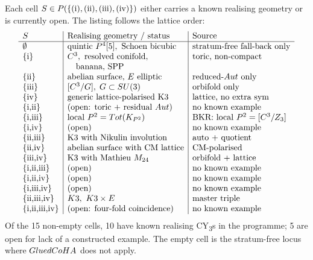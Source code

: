 \begin{example}
\label{ex:stratum-occupancy}
Each cell $S \in \mathcal{P}(\{(\text i), (\text{ii}), (\text{iii}),
(\text{iv})\})$ either carries a known realising geometry or is
currently open. The listing follows the lattice order:
\[
\begin{array}{l|l|l}
  S & \text{Realising geometry / status} &
    \text{Source} \\\hline
  \emptyset & \text{quintic } \bP^4[5],\ \text{Schoen bicubic} &
    \text{stratum-free fall-back only} \\
  \{\text{i}\} & \bC^3,\ \text{resolved conifold}, &
    \text{toric, non-compact} \\
   & \quad\text{banana, SPP} & \\
  \{\text{ii}\} & \text{abelian surface, }E\text{ elliptic} &
    \text{reduced-}\Aut\text{ only} \\
  \{\text{iii}\} & [\bC^3/G],\; G \subset SU(3) &
    \text{orbifold only} \\
  \{\text{iv}\} & \text{generic lattice-polarised K3} &
    \text{lattice, no extra sym} \\
  \{\text{i,ii}\} & \text{(open: toric + residual }\Aut) &
    \text{no known example} \\
  \{\text{i,iii}\} & \text{local } \bP^2 = \Tot(K_{\bP^2}) &
    \text{BKR: local }\bP^2 = [\bC^3/\bZ_3] \\
  \{\text{i,iv}\} & \text{(open)} & \text{no known example} \\
  \{\text{ii,iii}\} & \text{K3 with Nikulin involution} &
    \text{auto + quotient} \\
  \{\text{ii,iv}\} & \text{abelian surface with CM lattice} &
    \text{CM-polarised} \\
  \{\text{iii,iv}\} & \text{K3 with Mathieu } M_{24} &
    \text{orbifold + lattice} \\
  \{\text{i,ii,iii}\} & \text{(open)} & \text{no known example} \\
  \{\text{i,ii,iv}\} & \text{(open)} & \text{no known example} \\
  \{\text{i,iii,iv}\} & \text{(open)} & \text{no known example} \\
  \{\text{ii,iii,iv}\} & K3,\ K3 \times E & \text{master triple} \\
  \{\text{i,ii,iii,iv}\} & \text{(open: four-fold coincidence)} &
    \text{no known example}
\end{array}
\]
Of the 15 non-empty cells, 10 have known realising
CY\textsubscript{3}s in the programme; 5 are open for lack of a
constructed example. The empty cell is the stratum-free locus
where $\GlCoHA$ does not apply.
\end{example}

